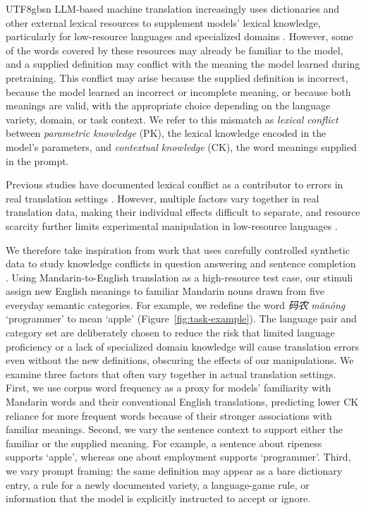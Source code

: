 \documentclass[11pt]{article}
\begin{document}
\begin{CJK*}{UTF8}{gbsn}
LLM-based machine translation increasingly uses dictionaries and other external lexical resources to supplement models’ lexical knowledge, particularly for low-resource languages \citep{ghazvininejad2023dictionary,lu2025slow} and specialized domains \citep{bogoychev2023terminology,li2025domain}. However, some of the words covered by these resources may already be familiar to the model, and a supplied definition may conflict with the meaning the model learned during pretraining. This conflict may arise because the supplied definition is incorrect, because the model learned an incorrect or incomplete meaning, or because both meanings are valid, with the appropriate choice depending on the language variety, domain, or task context. We refer to this mismatch as \emph{lexical conflict} between \emph{parametric knowledge} (PK), the lexical knowledge encoded in the model’s parameters, and \emph{contextual knowledge} (CK), the word meanings supplied in the prompt.

Previous studies have documented lexical conflict as a contributor to errors in real translation settings \citep{huang2024translate,court2024shortcomings,merx2025tulun}. However, multiple factors vary together in real translation data, making their individual effects difficult to separate, and resource scarcity further limits experimental manipulation in low-resource languages \citep{barua2024lexical}.

We therefore take inspiration from work that uses carefully controlled synthetic data to study knowledge conflicts in question answering \citep{longpre2021entity} and sentence completion \citep{shi2024trusting}. Using Mandarin-to-English translation as a high-resource test case, our stimuli assign new English meanings to familiar Mandarin nouns drawn from five everyday semantic categories. For example, we redefine the word \emph{码农} \textit{mǎnóng} `programmer' to mean `apple' (Figure~\ref{fig:task-example}). The language pair and category set are deliberately chosen to reduce the risk that limited language proficiency or a lack of specialized domain knowledge will cause translation errors even without the new definitions, obscuring the effects of our manipulations. We examine three factors that often vary together in actual translation settings. First, we use corpus word frequency as a proxy for models' familiarity with Mandarin words and their conventional English translations, predicting lower CK reliance for more frequent words because of their stronger associations with familiar meanings. Second, we vary the sentence context to support either the familiar or the supplied meaning. For example, a sentence about ripeness supports `apple', whereas one about employment supports `programmer'. Third, we vary prompt framing: the same definition may appear as a bare dictionary entry, a rule for a newly documented variety, a language-game rule, or information that the model is explicitly instructed to accept or ignore.


\end{CJK*}
\end{document}
